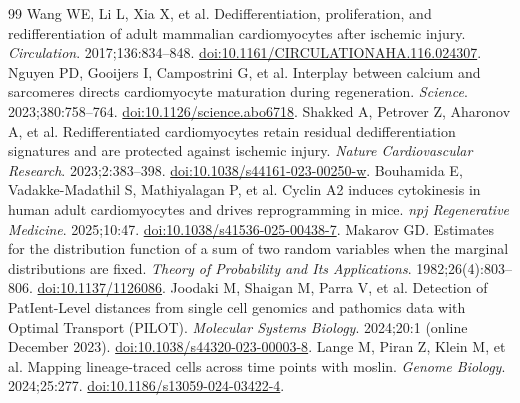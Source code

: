 \documentclass[11pt]{article}
\begin{document}
\begin{thebibliography}{99}
 Wang WE, Li L, Xia X, et al. Dedifferentiation, proliferation, and redifferentiation of adult mammalian cardiomyocytes after ischemic injury. \emph{Circulation}. 2017;136:834--848. \href{https://doi.org/10.1161/CIRCULATIONAHA.116.024307}{doi:10.1161/CIRCULATIONAHA.116.024307}.
 Nguyen PD, Gooijers I, Campostrini G, et al. Interplay between calcium and sarcomeres directs cardiomyocyte maturation during regeneration. \emph{Science}. 2023;380:758--764. \href{https://doi.org/10.1126/science.abo6718}{doi:10.1126/science.abo6718}.
 Shakked A, Petrover Z, Aharonov A, et al. Redifferentiated cardiomyocytes retain residual dedifferentiation signatures and are protected against ischemic injury. \emph{Nature Cardiovascular Research}. 2023;2:383--398. \href{https://doi.org/10.1038/s44161-023-00250-w}{doi:10.1038/s44161-023-00250-w}.
 Bouhamida E, Vadakke-Madathil S, Mathiyalagan P, et al. Cyclin A2 induces cytokinesis in human adult cardiomyocytes and drives reprogramming in mice. \emph{npj Regenerative Medicine}. 2025;10:47. \href{https://doi.org/10.1038/s41536-025-00438-7}{doi:10.1038/s41536-025-00438-7}.
 Makarov GD. Estimates for the distribution function of a sum of two random variables when the marginal distributions are fixed. \emph{Theory of Probability and Its Applications}. 1982;26(4):803--806. \href{https://doi.org/10.1137/1126086}{doi:10.1137/1126086}.
 Joodaki M, Shaigan M, Parra V, et al. Detection of PatIent-Level distances from single cell genomics and pathomics data with Optimal Transport (PILOT). \emph{Molecular Systems Biology}. 2024;20:1 (online December 2023). \href{https://doi.org/10.1038/s44320-023-00003-8}{doi:10.1038/s44320-023-00003-8}.
 Lange M, Piran Z, Klein M, et al. Mapping lineage-traced cells across time points with moslin. \emph{Genome Biology}. 2024;25:277. \href{https://doi.org/10.1186/s13059-024-03422-4}{doi:10.1186/s13059-024-03422-4}.
\end{thebibliography}
\end{document}
